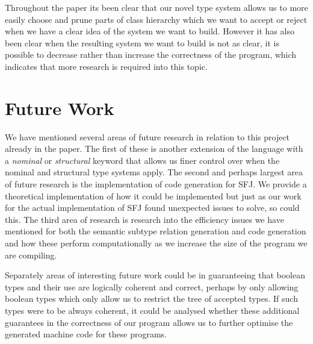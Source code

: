 \documentclass{l4proj}
\begin{document}
Throughout the paper its been clear that our novel type system allows us to more easily choose and prune parts of class hierarchy which we want to accept or reject when we have a clear idea of the system we want to build.
However it has also been clear when the resulting system we want to build is not as clear, it is possible to decrease rather than increase the correctness of the program, which indicates that more research is required into this topic.

\section{Future Work}

We have mentioned several areas of future research in relation to this project already in the paper.
The first of these is another extension of the language with a \emph{nominal} or \emph{structural} keyword that allows us finer control over when the nominal and structural type systems apply.
The second and perhaps largest area of future research is the implementation of code generation for SFJ.
We provide a theoretical implementation of how it could be implemented but just as our work for the actual implementation of SFJ found unexpected issues to solve, so could this.
The third area of research is research into the efficiency issues we have mentioned for both the semantic subtype relation generation and code generation and how these perform computationally as we increase the size of the program we are compiling.

Separately areas of interesting future work could be in guaranteeing that boolean types and their use are logically coherent and correct, perhaps by only allowing boolean types which only allow us to restrict the tree of accepted types.
If such types were to be always coherent, it could be analysed whether these additional guarantees in the correctness of our program allows us to further optimise the generated machine code for these programs.

\end{document}
